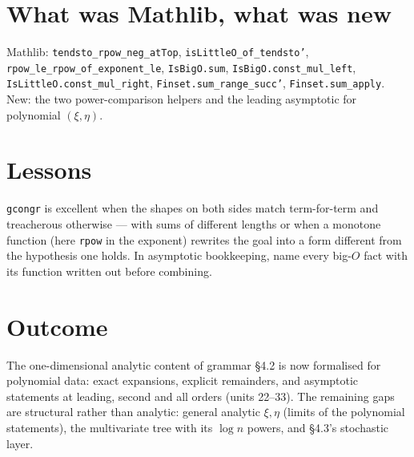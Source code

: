 \documentclass[11pt]{article}
\begin{document}
\section{What was Mathlib, what was new}
Mathlib: \texttt{tendsto\_rpow\_neg\_atTop}, \texttt{isLittleO\_of\_tendsto'},
\texttt{rpow\_le\_rpow\_of\_exponent\_le}, \texttt{IsBigO.sum}, \texttt{IsBigO.const\_mul\_left},
\texttt{IsLittleO.const\_mul\_right}, \texttt{Finset.sum\_range\_succ'}, \texttt{Finset.sum\_apply}. New:
the two power-comparison helpers and the leading asymptotic for polynomial $(\xi,\eta)$.

\section{Lessons}
\texttt{gcongr} is excellent when the shapes on both sides match term-for-term and treacherous
otherwise --- with sums of different lengths or when a monotone function (here \texttt{rpow} in the
exponent) rewrites the goal into a form different from the hypothesis one holds. In asymptotic
bookkeeping, name every big-$O$ fact with its function written out before combining.

\section{Outcome}
The one-dimensional analytic content of grammar \S4.2 is now formalised for polynomial data: exact
expansions, explicit remainders, and asymptotic statements at leading, second and all orders (units
22--33). The remaining gaps are structural rather than analytic: general analytic $\xi,\eta$ (limits of
the polynomial statements), the multivariate tree with its $\log n$ powers, and \S4.3's stochastic
layer.
\end{document}
